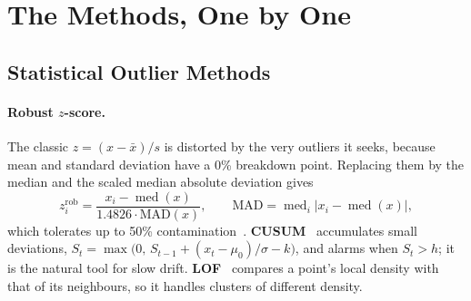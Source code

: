 \documentclass[11pt,a4paper]{article}
\begin{document}
\section{The Methods, One by One}
\label{sec:methods}

\subsection{Statistical Outlier Methods}
\paragraph{Robust $z$-score.} The classic $z=(x-\bar x)/s$ is distorted by the very outliers it seeks,
because mean and standard deviation have a 0\% breakdown point. Replacing them by the median and the scaled
median absolute deviation gives
\begin{equation}
  z_i^{\mathrm{rob}}=\frac{x_i-\operatorname{med}(x)}{1.4826\cdot\mathrm{MAD}(x)},\qquad
  \mathrm{MAD}=\operatorname{med}_i\lvert x_i-\operatorname{med}(x)\rvert,
\end{equation}
which tolerates up to 50\% contamination~\cite{rousseeuw,leys}. \textbf{CUSUM}~\cite{page} accumulates small
deviations, $S_t=\max\bigl(0,\,S_{t-1}+(x_t-\mu_0)/\sigma-k\bigr)$, and alarms when $S_t>h$; it is the
natural tool for slow drift. \textbf{LOF}~\cite{lof} compares a point's local density with that of its
neighbours, so it handles clusters of different density.
\end{document}
